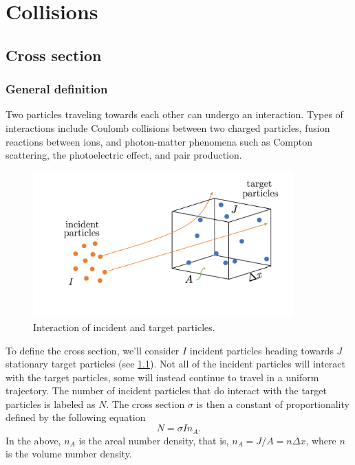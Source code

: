 \documentclass[a4paper,11pt]{report}
\begin{document}
\chapter{Collisions}
\section{Cross section}
\subsection{General definition}
Two particles traveling towards each other can undergo an interaction. Types of interactions include Coulomb collisions between two charged particles, fusion reactions between ions, and photon-matter phenomena such as Compton scattering, the photoelectric effect, and pair production.

\begin{figure}[ht]
    \centering
    \includegraphics[width=10cm]{../../images/cross_section.pdf}
    \caption{Interaction of incident and target particles.}
    \label{fig:cross_many_particles}
\end{figure}
To define the cross section, we'll consider $I$ incident particles heading towards $J$ stationary target particles (see \cref{fig:cross_many_particles}). Not all of the incident particles will interact with the target particles, some will instead continue to travel in a uniform trajectory. The number of incident particles that do interact with the target particles is labeled as $N$. The cross section $\sigma$ is then a constant of proportionality defined by the following equation
\begin{equation}
    \label{eq:cross_def}
    N = \sigma I n_A.
\end{equation}
In the above, $n_A$ is the areal number density, that is, $n_A = J / A = n \Delta x$, where $n$ is the volume number density.
\end{document}
